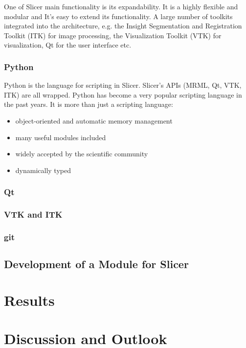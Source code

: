One of Slicer main functionality is its expandability. It is a highly flexible and modular and It's easy to extend its functionality. A large number of toolkits integrated into the architecture, e.g. the Insight Segmentation and Registration Toolkit (ITK) for image processing, the Visualization Toolkit (VTK) for visualization, Qt for the user interface etc.

\subsubsection{Python}

Python is the language for scripting in Slicer. Slicer's APIs (MRML, Qt, VTK, ITK) are all wrapped. Python has become a very popular scripting language in the past years. It is more than just a scripting language: 
\begin{itemize}
\item object-oriented and automatic memory management
\item many useful modules included
\item widely accepted by the scientific community
\item dynamically typed
\end{itemize}


\subsubsection{Qt}
\subsubsection{VTK and ITK}
\subsubsection{git}

\subsection{Development of a Module for Slicer}
\section{Results}

\section{Discussion and Outlook}


